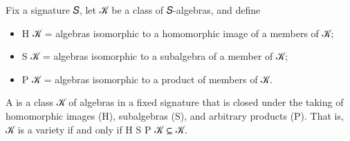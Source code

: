 \documentclass[a4paper,UKenglish,cleveref,autoref,thm-restate]{lipics-v2021}
\begin{document}
Fix a signature \ab 𝑆, let \ab 𝒦 be a class of \ab 𝑆-algebras, and define
\begin{itemize}
\item
  \af H \ab 𝒦 = algebras isomorphic to a homomorphic image of a members of \ab 𝒦;
\item
  \af S \ab 𝒦 = algebras isomorphic to a subalgebra of a member of \ab 𝒦;
\item
  \af P \ab 𝒦 = algebras isomorphic to a product of members of \ab 𝒦.
\end{itemize}
A  is a class \ab 𝒦 of algebras in a fixed signature that is closed under the taking of homomorphic images (\af H), subalgebras (\af S), and arbitrary products (\af P). That is, \ab 𝒦 is a variety if and only if
\af H \af S \af P \ab 𝒦 \aof ⊆ \ab 𝒦.
\end{document}

